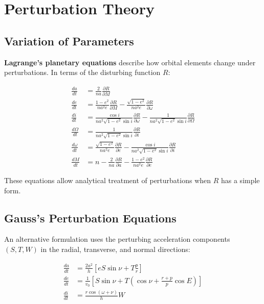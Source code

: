 \section{Perturbation Theory}

\subsection{Variation of Parameters}

\textbf{Lagrange's planetary equations} describe how orbital elements change under perturbations. In terms of the disturbing function $R$:

\begin{align}
    \frac{da}{dt} &= \frac{2}{na}\frac{\partial R}{\partial M} \\
    \frac{de}{dt} &= \frac{1-e^2}{na^2 e}\frac{\partial R}{\partial M} - \frac{\sqrt{1-e^2}}{na^2 e}\frac{\partial R}{\partial \omega} \\
    \frac{di}{dt} &= \frac{\cos i}{na^2\sqrt{1-e^2}\sin i}\frac{\partial R}{\partial \omega} - \frac{1}{na^2\sqrt{1-e^2}\sin i}\frac{\partial R}{\partial \Omega} \\
    \frac{d\Omega}{dt} &= \frac{1}{na^2\sqrt{1-e^2}\sin i}\frac{\partial R}{\partial i} \\
    \frac{d\omega}{dt} &= \frac{\sqrt{1-e^2}}{na^2 e}\frac{\partial R}{\partial e} - \frac{\cos i}{na^2\sqrt{1-e^2}\sin i}\frac{\partial R}{\partial i} \\
    \frac{dM}{dt} &= n - \frac{2}{na}\frac{\partial R}{\partial a} - \frac{1-e^2}{na^2 e}\frac{\partial R}{\partial e}
\end{align}

These equations allow analytical treatment of perturbations when $R$ has a simple form.

\subsection{Gauss's Perturbation Equations}

An alternative formulation uses the perturbing acceleration components $(S, T, W)$ in the radial, transverse, and normal directions:

\begin{align}
    \frac{da}{dt} &= \frac{2a^2}{h}\left[eS\sin\nu + T\frac{p}{r}\right] \\
    \frac{de}{dt} &= \frac{1}{v_0}\left[S\sin\nu + T\left(\cos\nu + \frac{r+p}{p}\cos E\right)\right] \\
    \frac{di}{dt} &= \frac{r\cos(\omega + \nu)}{h}W
\end{align}

